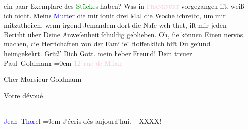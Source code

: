                ein paar Exemplare des \textcolor{green}{Stückes}{}
               haben?\pend
           \pstart
           Was in \textsc{\textcolor{pink}{Frankfurt}{}\ledrightnote{\textcolor{pink}{Frankfurt am Main}}} vorgegangen iſt, weiß ich nicht. Meine \textcolor{blue}{Mutter}{} die mir ſonſt drei Mal die Woche ſchreibt, um {\pb}mir mitzutheilen, wenn irgend Jemandem dort die Naſe
               weh thut, iſt mir jeden Bericht über Deine Anweſenheit ſchuldig geblieben. Oh, ſie
               können Einen nervös machen, die Herrſchaften von der Familie!\pend
           \pstart
           Hoffenklich biſt Du geſund heimgekehrt.\pend
           \pstart
           Grüß’ Dich Gott, mein lieber Freund!\pend
           \pstart
           Dein treuer {\\[\baselineskip]}\spacefill\mbox{Paul Goldmann}\pend
           \leftskip=0em{}\pstart
           \raggedleft{}{\pb}\textcolor{pink}{12 rue de Milan}{}\ledrightnote{\textcolor{pink}{Rue de Milan}}\pend
           \pstart{}\begin{otherlanguage}{french}Cher Monsieur Goldmann\end{otherlanguage}\pend\pstart
           \label{K_L02764-2v}\label{K_L02764-2h}\pend
           \pstart
           \begin{otherlanguage}{french}Votre dévoué\end{otherlanguage}{\\[\baselineskip]}\spacefill\mbox{\textcolor{blue}{Jean Thorel}{}\ledrightnote{\textcolor{blue}{Jean Thorel}}}\pend
           \leftskip=0em{}\pstart
           \noindent{}J’écris dès aujourd’hui. – XXXX!\pend
           \endnumbering{}\begin{anhang}\end{anhang}
      
